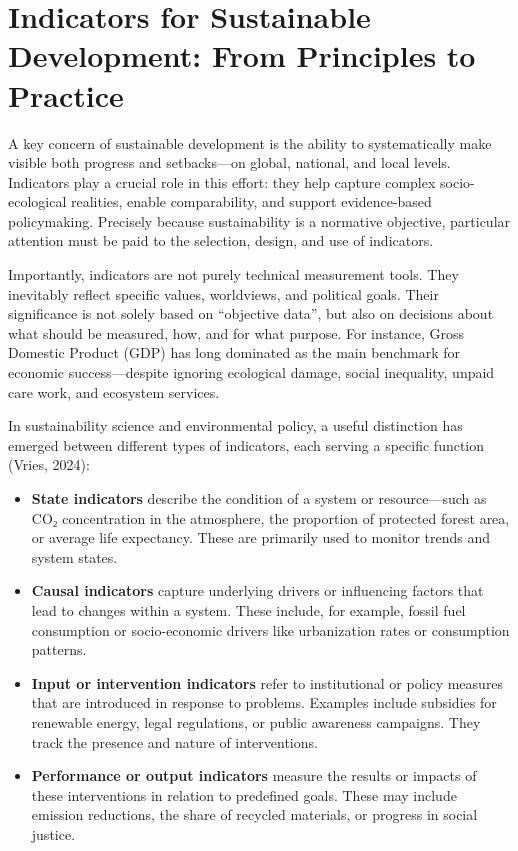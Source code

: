 \documentclass[
  a4paper,
  openany]{book}
\begin{document}
\section{Indicators for Sustainable Development: From Principles to
Practice}\label{indicators-for-sustainable-development-from-principles-to-practice}

A key concern of sustainable development is the ability to
systematically make visible both progress and setbacks---on global,
national, and local levels. Indicators play a crucial role in this
effort: they help capture complex socio-ecological realities, enable
comparability, and support evidence-based policymaking. Precisely
because sustainability is a normative objective, particular attention
must be paid to the selection, design, and use of indicators.

Importantly, indicators are not purely technical measurement tools. They
inevitably reflect specific values, worldviews, and political goals.
Their significance is not solely based on ``objective data'', but also
on decisions about what should be measured, how, and for what purpose.
For instance, Gross Domestic Product (GDP) has long dominated as the
main benchmark for economic success---despite ignoring ecological
damage, social inequality, unpaid care work, and ecosystem services.

In sustainability science and environmental policy, a useful distinction
has emerged between different types of indicators, each serving a
specific function (Vries, 2024):

\begin{itemize}
\item
  \textbf{State indicators} describe the condition of a system or
  resource---such as CO₂ concentration in the atmosphere, the proportion
  of protected forest area, or average life expectancy. These are
  primarily used to monitor trends and system states.
\item
  \textbf{Causal indicators} capture underlying drivers or influencing
  factors that lead to changes within a system. These include, for
  example, fossil fuel consumption or socio-economic drivers like
  urbanization rates or consumption patterns.
\item
  \textbf{Input or intervention indicators} refer to institutional or
  policy measures that are introduced in response to problems. Examples
  include subsidies for renewable energy, legal regulations, or public
  awareness campaigns. They track the presence and nature of
  interventions.
\item
  \textbf{Performance or output indicators} measure the results or
  impacts of these interventions in relation to predefined goals. These
  may include emission reductions, the share of recycled materials, or
  progress in social justice.
\end{itemize}
\end{document}
